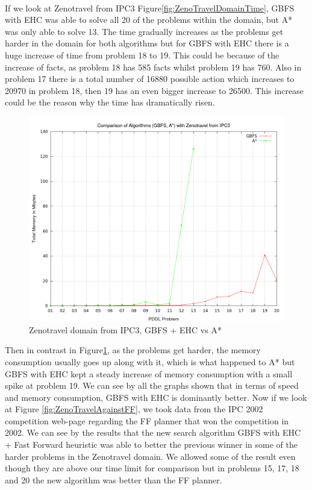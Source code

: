 \\
If we look at Zenotravel from IPC3 Figure\ref{fig:ZenoTravelDomainTime}, GBFS with EHC was able to solve all 20 of the problems within the domain, but A* was only able to solve 13. The time gradually increases as the problems get harder in the domain for both algorithms but for GBFS with EHC there is a huge increase of time from problem 18 to 19. This could be because of the increase of facts, as problem 18 has 585 facts whilst problem 19 has 760. Also in problem 17 there is a total number of 16880 possible action which increases to 20970 in problem 18, then 19 has an even bigger increase to 26500. This increase could be the reason why the time has dramatically risen. 
\begin{figure}[!htb]
    \centering
    \includegraphics[scale=0.35]{ZenoMemory.png}
    \caption{Zenotravel domain from IPC3, GBFS + EHC vs A* }
    \label{fig:ZenoTravelDomainMemory}
\end{figure}
Then in contrast in Figure\ref{fig:ZenoTravelDomainMemory}, as the problems get harder, the memory consumption usually goes up along with it, which is what happened to A* but GBFS with EHC kept a steady increase of memory consumption with a small spike at problem 19. We can see by all the graphs shown that in terms of speed and memory consumption, GBFS with EHC is dominantly better.
Now if we look at Figure \ref{fig:ZenoTravelAgainstFF}, we took data from the IPC 2002 competition web-page \cite{ICAPS2002} regarding the FF planner that won the competition in 2002. We can see by the results that the new search algorithm GBFS with EHC + Fast Forward heuristic was able to better the previous winner in some of the harder problems in the Zenotravel domain. We allowed some of the result even though they are above our time limit for comparison but in problems 15, 17, 18 and 20 the new algorithm was better than the FF planner. 
